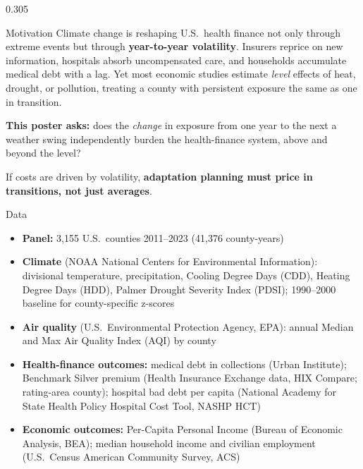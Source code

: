 \documentclass[final,t]{beamer}
\begin{document}
\begin{frame}[t,fragile]
\begin{columns}[t]
\begin{column}{0.305\paperwidth}
\begin{posterblock}{Motivation}
\normalsize
Climate change is reshaping U.S.\ health finance not only through extreme events but through \textbf{year-to-year volatility}. Insurers reprice on new information, hospitals absorb uncompensated care, and households accumulate medical debt with a lag. Yet most economic studies estimate \emph{level} effects of heat, drought, or pollution, treating a county with persistent exposure the same as one in transition.

\vspace{2mm}
\textbf{This poster asks:} does the \emph{change} in exposure from one year to the next \textemdash{} a weather swing \textemdash{} independently burden the health-finance system, above and beyond the level?

\vspace{2mm}
If costs are driven by volatility, \textbf{adaptation planning must price in transitions, not just averages}.
\end{posterblock}

\vspace{3mm}

\begin{posterblock}{Data}
\normalsize
\begin{itemize}
\setlength\itemsep{1mm}
\item \textbf{Panel:} 3{,}155 U.S.\ counties \texttimes{} 2011--2023 (41{,}376 county-years)
\item \textbf{Climate} (NOAA National Centers for Environmental Information): divisional temperature, precipitation, Cooling Degree Days (CDD), Heating Degree Days (HDD), Palmer Drought Severity Index (PDSI); 1990--2000 baseline for county-specific z-scores
\item \textbf{Air quality} (U.S.\ Environmental Protection Agency, EPA): annual Median and Max Air Quality Index (AQI) by county
\item \textbf{Health-finance outcomes:} medical debt in collections (Urban Institute); Benchmark Silver premium (Health Insurance Exchange data, HIX Compare; rating-area \textrightarrow{} county); hospital bad debt per capita (National Academy for State Health Policy Hospital Cost Tool, NASHP HCT)
\item \textbf{Economic outcomes:} Per-Capita Personal Income (Bureau of Economic Analysis, BEA); median household income and civilian employment (U.S.\ Census American Community Survey, ACS)
\end{itemize}
\end{posterblock}


\end{column}
\end{columns}
\end{frame}
\end{document}
